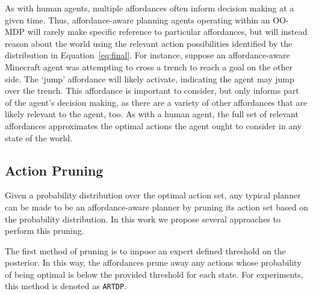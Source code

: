 \documentclass[conference]{IEEEtran}
\newcommand{\stnote}[1]{\textcolor{Blue}{\textbf{}}}
\newcommand{\dnote}[1]{\textcolor{Green}{\textbf{}}}
\begin{document}
  
As with human agents, multiple affordances often inform decision making at a given time.
Thus, affordance-aware planning agents operating within an OO-MDP will
rarely make specific reference to particular affordances, but will
instead reason about the world using the relevant action possibilities
identified by the distribution in Equation~\ref{eq:final}. For
instance, suppose an affordance-aware Minecraft agent was attempting
to cross a trench to reach a goal on the other side. The `jump'
affordance will likely activate, indicating the agent may jump over
the trench. This affordance is important to consider,
but only informs part of the agent's decision making, as there are a variety
of other affordances that are likely relevant to the agent, too. As with a human
agent, the full set of relevant affordances approximates the optimal actions the
agent ought to consider in any state of the world.

\subsection{Action Pruning}
\label{sec:action_pruning}
Given a probability distribution over the optimal action set, any typical
planner can be made to be an affordance-aware planner by pruning its action
set based on the probability distribution. In this work we propose several approaches to perform this pruning.

The first method of pruning is to impose an expert defined threshold on the posterior. In this way, the affordances prune away any actions whose probability of being optimal is below the provided threshold for each state. For experiments, this method is denoted as \texttt{ARTDP}.
\end{document}
